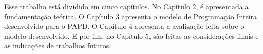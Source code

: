 Esse trabalho está dividido em cinco capítulos. No Capítulo 2, é apresentada a fundamentação teórica. O Capítulo 3 apresenta o modelo de Programação Inteira desenvolvido para o PAPD. O Capítulo 4 apresenta a avalização feita sobre o modelo desenvolvido. E por fim, no Capítulo 5, são feitas as considerações finais e as indicações de trabalhos futuros.

	